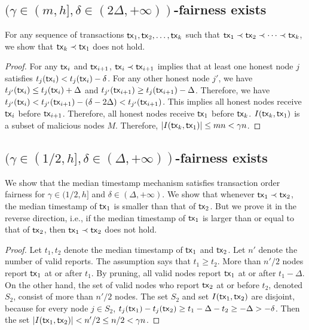 \documentclass[runningheads]{llncs}
\begin{document}
\subsection{$(\gamma\in(m,h], \delta\in(2\Delta,+\infty))$-fairness exists}

For any sequence of transactions $\mathsf{tx}_1, \mathsf{tx}_2, \dots, \mathsf{tx}_k$ such that $\mathsf{tx}_1\prec \mathsf{tx}_2\prec \cdots \prec \mathsf{tx}_k$, we show that $\mathsf{tx}_k \prec \mathsf{tx}_1$ does not hold. 
\begin{proof}
For any $\mathsf{tx}_i$ and $\mathsf{tx}_{i+1}$, $\mathsf{tx}_i\prec \mathsf{tx}_{i+1}$ implies that at least one honest node $j$ satisfies $t_j(\mathsf{tx}_{i}) < t_j(\mathsf{tx}_{i}) - \delta$. For any other honest node $j'$, we have $t_{j'}(\mathsf{tx}_{i}) \le t_j(\mathsf{tx}_{i}) + \Delta$ and $t_{j'}(\mathsf{tx}_{i+1}) \ge t_j(\mathsf{tx}_{i+1}) - \Delta$. Therefore, we have $t_{j'}(\mathsf{tx}_i) < t_{j'}(\mathsf{tx}_{i+1}) - (\delta - 2\Delta) < t_{j'}(\mathsf{tx}_{i+1})$. This implies all honest nodes receive $\mathsf{tx}_{i}$ before $\mathsf{tx}_{i+1}$. Therefore, all honest nodes receive $\mathsf{tx}_{1}$ before $\mathsf{tx}_{k}$. $I(\mathsf{tx}_{k}, \mathsf{tx}_{1})$ is a subset of malicious nodes $M$. Therefore, $|I(\mathsf{tx}_{k}, \mathsf{tx}_{1})|\le mn < \gamma n$. 
\end{proof} 

\subsection{$(\gamma\in(1/2,h], \delta\in(\Delta,+\infty))$-fairness exists}
We show that the median timestamp mechanism satisfies transaction order fairness for $\gamma\in(1/2,h]$ and $\delta\in(\Delta,+\infty)$. We show that whenever $\mathsf{tx}_1\prec \mathsf{tx}_2$, the median timestamp of $\mathsf{tx}_1$ is smaller than that of $\mathsf{tx}_2$. But we prove it in the reverse direction, i.e., if the median timestamp of $\mathsf{tx}_1$ is larger than or equal to that of $\mathsf{tx}_2$, then $\mathsf{tx}_1\prec \mathsf{tx}_2$ does not hold. 

\begin{proof}
    Let $t_1, t_2$ denote the median timestamp of $\mathsf{tx}_1$ and $\mathsf{tx}_2$. Let $n'$ denote the number of valid reports. The assumption says that $t_1\ge t_2$. More than $n'/2$ nodes report $\mathsf{tx}_1$ at or after $t_1$. By pruning, all valid nodes report $\mathsf{tx}_1$ at or after $t_1-\Delta$. On the other hand, the set of valid nodes who report $\mathsf{tx}_2$ at or before $t_2$, denoted $S_2$, consist of more than $n'/2$ nodes. The set $S_2$ and set $I(\mathsf{tx}_1, \mathsf{tx}_2)$ are disjoint, because for every node $j\in S_2$, $t_j(\mathsf{tx}_1) - t_j(\mathsf{tx}_2)\ge t_1 - \Delta -t_2 \ge -\Delta > -\delta$. Then the set $|I(\mathsf{tx}_1,\mathsf{tx}_2)| < n'/2 \le n/2 < \gamma n$.   
\end{proof}
\end{document}
